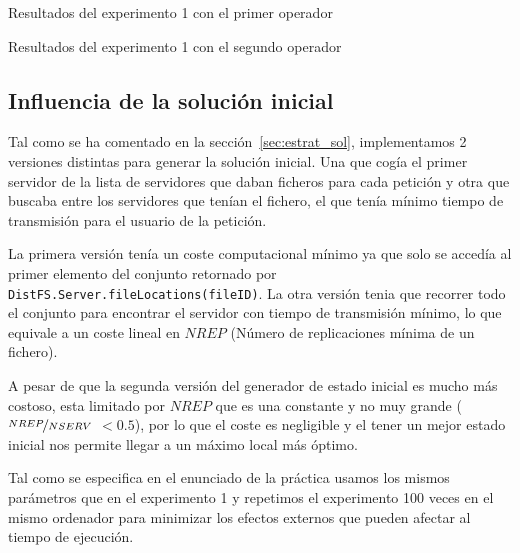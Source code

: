 \begin{table}[H]
    \caption{Resultados del experimento 1 con el primer operador}%
    \label{tab:ex1a}
\vspace{-1em}
    \begin{center}
    
    \end{center}
\vspace{-0.5em}
    \caption{Resultados del experimento 1 con el segundo operador}%
    \label{tab:ex1b}
\vspace{-1.5em}
    \begin{center}
    
    \end{center}
\end{table}


\subsection{Influencia de la solución inicial}

Tal como se ha comentado en la sección~\ref{sec:estrat_sol}, implementamos 2 versiones distintas
para generar la solución inicial. Una que cogía el primer servidor de la lista de servidores que daban ficheros
para cada petición y otra que buscaba entre los servidores que tenían el fichero, el que tenía mínimo
tiempo de transmisión para el usuario de la petición.

La primera versión tenía un coste computacional mínimo ya que solo se accedía al primer elemento del
conjunto retornado por \texttt{DistFS.Server.fileLocations(fileID)}. La otra versión tenia que recorrer
todo el conjunto para encontrar el servidor con tiempo de transmisión mínimo, lo que equivale a un coste
lineal en $NREP$ (Número de replicaciones mínima de un fichero).

\begin{hyp*}
A pesar de que la segunda versión del generador de estado inicial es mucho más costoso, esta limitado
por $NREP$ que es una constante y no muy grande ($\nicefrac{NREP}{NSERV}$ $<0.5$), por lo que el coste es negligible
y el tener un mejor estado inicial nos permite llegar a un máximo local más óptimo.
\end{hyp*}

Tal como se especifica en el enunciado de la práctica usamos los mismos parámetros que en el experimento
1 y repetimos el experimento 100 veces en el mismo ordenador para minimizar los efectos externos que
pueden afectar al tiempo de ejecución.

